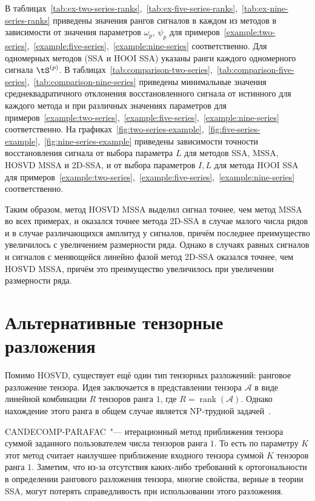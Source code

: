 \documentclass[specialist,
    substylefile = spbu_report.rtx,
    subf,href,colorlinks=true, 12pt]{disser}
\theoremstyle{plain}
\theoremstyle{definition}
\theoremstyle{remark}
\begin{document}
    В таблицах~\ref{tab:ex-two-series-ranks},~\ref{tab:ex-five-series-ranks},~\ref{tab:ex-nine-series-ranks}
    приведены значения рангов сигналов в каждом из методов в зависимости от значения параметров $\omega_p$, $\psi_p$
    для примеров~\ref{example:two-series},~\ref{example:five-series},~\ref{example:nine-series} соответственно.
    Для одномерных методов (SSA и HOOI SSA) указаны ранги каждого одномерного сигнала $\tS^{(p)}$.
    В таблицах~\ref{tab:comparison-two-series},~\ref{tab:comparison-five-series},~\ref{tab:comparison-nine-series}
    приведены минимальные значения среднеквадратичного отклонения
    восстановленного сигнала от истинного для каждого метода и при различных значениях параметров для
    примеров~\ref{example:two-series},~\ref{example:five-series},~\ref{example:nine-series} соответственно.
    На графиках~\ref{fig:two-series-example},~\ref{fig:five-series-example},~\ref{fig:nine-series-example}
    приведены зависимости точности восстановления
    сигнала от выбора параметра $L$ для методов SSA, MSSA, HOSVD MSSA и 2D-SSA, и от
    выбора параметров $I, L$ для метода HOOI SSA для
    примеров~\ref{example:two-series},~\ref{example:five-series},~\ref{example:nine-series} соответственно.

    Таким образом, метод HOSVD MSSA выделил сигнал точнее, чем метод MSSA во всех примерах, и
    оказался точнее метода 2D-SSA в случае малого числа рядов и в случае различающихся
    амплитуд у сигналов, причём последнее преимущество увеличилось с увеличением размерности ряда.
    Однако в случаях равных сигналов и сигналов с меняющейся линейно фазой метод 2D-SSA оказался точнее,
    чем HOSVD MSSA, причём это преимущество увеличилось при увеличении размерности ряда.

    \section{Альтернативные тензорные разложения}\label{sec:other-decomp}
    Помимо HOSVD, существует ещё один тип тензорных разложений: ранговое разложение тензора.
    Идея заключается в представлении тензора $\mathcal{A}$ в виде линейной комбинации $R$ тензоров ранга $1$, где $R=\operatorname{rank}(\mathcal{A})$.
    Однако нахождение этого ранга в общем случае является NP-трудной задачей~\cite{NP-hard}.

    CANDECOMP-PARAFAC~\cite{parafac1, parafac2}"--- итерационный метод приближения тензора суммой заданного
    пользователем числа тензоров ранга $1$.
    То есть по параметру $K$ этот метод считает наилучшее приближение входного тензора суммой $K$ тензоров ранга $1$.
    Заметим, что из-за отсутствия каких-либо требований к ортогональности в определении рангового разложения тензора,
    многие свойства, верные в теории SSA, могут потерять справедливость при использовании этого разложения.
\end{document}
